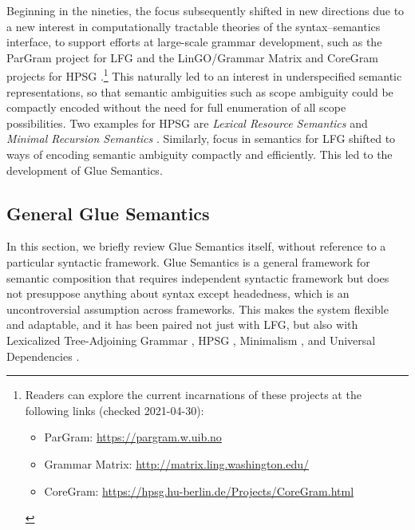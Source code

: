 \largerpage
Beginning in the nineties, the focus subsequently shifted in new directions due to a new interest in computationally tractable
theories of the syntax--semantics interface, to support efforts at
large-scale grammar development, such as the ParGram project for LFG
\citep{butt;ea99,butt;ea02-pargram} and the LinGO/Grammar Matrix and CoreGram projects for HPSG
\citep{flickinger00,bender;ea02,bender;ea10,MuellerCoreGram}.\footnote{Readers can
  explore the current incarnations of these projects at the following
links (checked 2021-04-30):
{
\begin{itemize}[leftmargin=2em]
\item ParGram: \url{https://pargram.w.uib.no}
\item Grammar Matrix: \url{http://matrix.ling.washington.edu/}
\item CoreGram: \url{https://hpsg.hu-berlin.de/Projects/CoreGram.html}
\end{itemize}}
\vspace{-\baselineskip}
} This naturally led to an
interest in underspecified semantic representations, so that semantic
ambiguities such as scope ambiguity could be compactly encoded without
the need for full enumeration of all scope possibilities. Two examples
for HPSG are \emph{Lexical Resource Semantics}\indexlrs \citep{richter04,penn;richter04}
and \emph{Minimal Recursion Semantics}\indexmrs
\citep{copestake;ea05}. Similarly, focus in semantics for LFG shifted
to ways of encoding semantic ambiguity compactly and efficiently. This
led to the development of Glue Semantics.



\subsection{General Glue Semantics}
\label{sec:glue-semantics}

In this section, we briefly review Glue Semantics itself, 
without reference to a particular
syntactic framework.  Glue Semantics is a general framework for
semantic composition that requires  independent syntactic
framework but does not presuppose anything about syntax except
headedness, which is an uncontroversial assumption across
frameworks. This makes the system flexible and adaptable, and it has
been paired not just with LFG, but also with Lexicalized
Tree-Adjoining Grammar \citep{frank;genabith01}, HPSG
\citep{asudeh;crouch01-hpsg-glue}, Minimalism \citep{Gotham2018}, and
Universal Dependencies \citep{gotham;haug18}.

